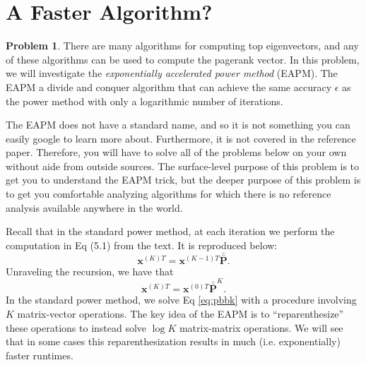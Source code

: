 \documentclass[10pt]{exam}
\theoremstyle{definition}
\newtheorem{problem}{Problem}
\newcommand{\p}{\mathbf P}
\newcommand{\pb}{\bar {\p}}
\newcommand{\pbb}{\bar {\pb}}
\newcommand{\x}{\mathbf x}
\begin{document}
\newpage
\section{A Faster Algorithm?}

\begin{problem}
    There are many algorithms for computing top eigenvectors,
    and any of these algorithms can be used to compute the pagerank vector.
    In this problem, we will investigate the \emph{exponentially accelerated power method} (EAPM).
    The EAPM a divide and conquer algorithm that can achieve the same accuracy $\epsilon$ as the power method with only a logarithmic number of iterations.

    The EAPM does not have a standard name,
    and so it is not something you can easily google to learn more about.
    Furthermore, it is not covered in the reference paper.
    Therefore, you will have to solve all of the problems below on your own without aide from outside sources.
    The surface-level purpose of this problem is to get you to understand the EAPM trick,
    but the deeper purpose of this problem is to get you comfortable analyzing algorithms for which there is no reference analysis available anywhere in the world.

    Recall that in the standard power method, at each iteration we perform the computation in Eq (5.1) from the text.
    It is reproduced below:
    \begin{equation}
        \label{eq:pbb}
        \x^{(K)T} = {\x^{(K-1)T}} \pbb
        .
    \end{equation}
    Unraveling the recursion, we have that
    \begin{equation}
        \label{eq:pbbk}
        \x^{(K)T} = {\x^{(0)T}} \pbb^K
        .
    \end{equation}
    In the standard power method, we solve Eq \eqref{eq:pbbk} with a procedure involving $K$ matrix-vector operations.
    The key idea of the EAPM is to ``reparenthesize'' these operations to instead solve $\log K$ matrix-matrix operations.
    We will see that in some cases this reparenthesization results in much (i.e. exponentially) faster runtimes.



\end{problem}
\end{document}
